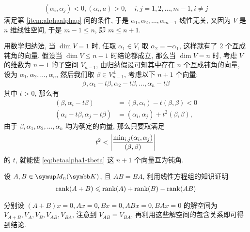 \begin{exercise}[series=exer]
\begin{answer}
\begin{answersheet}
            \begin{align*}
                (\alpha_{i}, \alpha_{j}) < 0, (\alpha_{i}, a) > 0, \quad i, j = 1, 2, \dots, m - 1, i \ne j
            \end{align*}
            满足第 \ref{item:alphaalphap} 问的条件, 于是 $ \alpha_{1}, \alpha_{2}, \dots, \alpha_{m - 1} $ 线性无关, 又因为 $ V $ 是 $ n $ 维线性空间, 于是 $ m - 1 \le n $, 即 $ m \le n + 1 $.
            \item 用数学归纳法, 当 $ \dim V = 1 $ 时, 任取 $ \alpha_{1} \in V $, 取 $ \alpha_{2} = -\alpha_{1} $, 这样就有了 $ 2 $ 个互成钝角的向量. 假设当 $ \dim V \le n - 1 $ 时结论都成立, 那么当 $ \dim V = n $ 时, 考虑 $ V $ 的维数为 $ n - 1 $ 的子空间 $ V_{n - 1} $, 由归纳假设可知其中存在 $ n $ 个互成钝角的向量, 设为 $ \alpha_{1}, \alpha_{2}, \dots, \alpha_{n} $, 然后我们取 $ \beta \in V_{n - 1}^{\bot} $, 考虑以下 $ n + 1 $ 个向量:
            \begin{align}\label{eq:betaalpha1-tbeta}
                \beta, \alpha_{1} - t\beta, \alpha_{2} - t\beta, \dots, \alpha_{n} - t\beta
            \end{align}
            其中 $ t > 0 $, 那么有
            \begin{align*}
                (\beta, \alpha_{i} - t\beta) & = (\beta, \alpha_{i}) - t(\beta, \beta) < 0\\
                (\alpha_{i} - t\beta, \alpha_{j} - t\beta) & = (\alpha_{i}, \alpha_{j}) + t^{2}(\beta, \beta),
            \end{align*}
            由于 $ \beta, \alpha_{1}, \alpha_{2}, \dots, \alpha_{n} $ 均为确定的向量, 那么只要取满足
            \begin{align*}
                t^{2} < \abs{\frac{\min_{i, j}(\alpha_{i}, \alpha_{j})}{(\beta, \beta)}}
            \end{align*}
            的 $ t $, 就能使 \eqref{eq:betaalpha1-tbeta} 这 $ n + 1 $ 个向量互为钝角.
        \end{answersheet}
    \end{answer}
    \item 设 $ A, B \in \MM[\K] $, 且 $ AB = BA $, 利用线性方程组的知识证明
    \begin{align*}
        \rank(A + B) \leqslant \rank(A) + \rank(B) - \rank(AB)
    \end{align*}
    \begin{hint}
        分别设 $ (A + B)x = 0, Ax = 0, Bx = 0, ABx = 0, BAx = 0 $ 的解空间为 $ V_{A+B}, V_{A}, V_{B}, V_{AB}, V_{BA} $, 注意到 $ V_{AB} = V_{BA} $, 再利用这些解空间的包含关系即可得到结论.

\end{hint}
\end{exercise}
